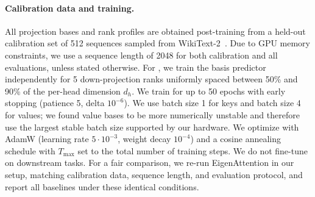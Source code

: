 \paragraph{Calibration data and training.}
All projection bases and rank profiles are obtained post-training from a held-out calibration set of 512 sequences sampled from WikiText-2~\cite{wikitext}.
Due to GPU memory constraints, we use a sequence length of 2048 for both calibration and all evaluations, unless stated otherwise.
For \methodname, we train the basis predictor independently for 5 down-projection ranks uniformly spaced between 50\% and 90\% of the per-head dimension $d_h$. We train for up to 50 epochs with early stopping (patience 5, delta $10^{-6}$).
We use batch size 1 for keys and batch size 4 for values; we found value bases to be more numerically unstable and therefore use the largest stable batch size supported by our hardware.
We optimize with AdamW (learning rate $5\cdot 10^{-3}$, weight decay $10^{-4}$) and a cosine annealing schedule with $T_{\max}$ set to the total number of training steps. We do not fine-tune on downstream tasks.
For a fair comparison, we re-run EigenAttention in our setup, matching calibration data, sequence length, and evaluation protocol, and report all baselines under these identical conditions.


